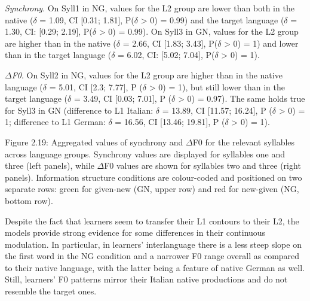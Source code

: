 \begin{listWWNumiiileveli}
\item 
\begin{stylelsBulletList}
\textit{Synchrony}. On Syll1 in NG, values for the L2 group are lower than both in the native ($\delta $ = 1.09, CI [0.31; 1.81], P($\delta $ {\textgreater} 0) = 0.99) and the target language ($\delta $ = 1.30, CI: [0.29; 2.19], P($\delta $ {\textgreater} 0) = 0.99). On Syll3 in GN, values for the L2 group are higher than in the native ($\delta $ = 2.66, CI [1.83; 3.43], P($\delta $ {\textgreater} 0) = 1) and lower than in the target language ($\delta $ = 6.02, CI: [5.02; 7.04], P($\delta $ {\textgreater} 0) = 1).
\end{stylelsBulletList}
\item 
\begin{stylelsBulletList}
\textit{${\Delta}$F0}. On Syll2 in NG, values for the L2 group are higher than in the native language ($\delta $ = 5.01, CI [2.3; 7.77], P ($\delta $ {\textgreater} 0) = 1), but still lower than in the target language ($\delta $ = 3.49, CI [0.03; 7.01], P ($\delta $ {\textgreater} 0) = 0.97). The same holds true for Syll3 in GN (difference to L1 Italian: $\delta $ = 13.89, CI [11.57; 16.24], P ($\delta $ {\textgreater} 0) = 1; difference to L1 German: $\delta $ = 16.56, CI [13.46; 19.81], P ($\delta $ {\textgreater} 0) = 1).
\end{stylelsBulletList}
\end{listWWNumiiileveli}
\begin{styleStandard}
  [Warning: Image ignored] %
 
\end{styleStandard}

\begin{stylecaption}
Figure 2.19: Aggregated values of synchrony and ${\Delta}$F0 for the relevant syllables across language groups. Synchrony values are displayed for syllables one and three (left panels), while ${\Delta}$F0 values are shown for syllables two and three (right panels). Information structure conditions are colour-coded and positioned on two separate rows: green for given-new (GN, upper row) and red for new-given (NG, bottom row).
\end{stylecaption}

\begin{styleStandard}
Despite the fact that learners seem to transfer their L1 contours to their L2, the models provide strong evidence for some differences in their continuous modulation. In particular, in learners’ interlanguage there is a less steep slope on the first word in the NG condition and a narrower F0 range overall as compared to their native language, with the latter being a feature of native German as well. Still, learners’ F0 patterns mirror their Italian native productions and do not resemble the target ones.
\end{styleStandard}

